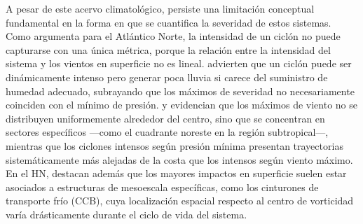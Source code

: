 A pesar de este acervo climatológico, persiste una limitación conceptual fundamental en la forma en que se cuantifica la severidad de estos sistemas. Como argumenta \citet{corner2025classification} para el Atlántico Norte, la intensidad de un ciclón no puede capturarse con una única métrica, porque la relación entre la intensidad del sistema y los vientos en superficie no es lineal. \citet{sinclair2023relationship} advierten que un ciclón puede ser dinámicamente intenso pero generar poca lluvia si carece del suministro de humedad adecuado, subrayando que los máximos de severidad no necesariamente coinciden con el mínimo de presión. \citet{bitencourt2010relating} y \citet{cardoso2022synoptic} evidencian que los máximos de viento no se distribuyen uniformemente alrededor del centro, sino que se concentran en sectores específicos —como el cuadrante noreste en la región subtropical—, mientras que los ciclones intensos según presión mínima presentan trayectorias sistemáticamente más alejadas de la costa que los intensos según viento máximo. En el HN, \citet{eisenstein2023identification} destacan además que los mayores impactos en superficie suelen estar asociados a estructuras de mesoescala específicas, como los cinturones de transporte frío (CCB), cuya localización espacial respecto al centro de vorticidad varía drásticamente durante el ciclo de vida del sistema.

